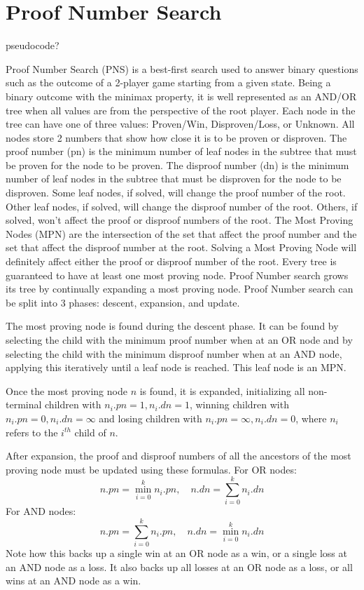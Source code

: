 \section{Proof Number Search} \label{sec:PNS}

pseudocode?

Proof Number Search (PNS) is a best-first search used to answer binary questions such as the outcome of a 2-player game starting from a given state. Being a binary outcome with the minimax property, it is well represented as an AND/OR tree when all values are from the perspective of the root player. Each node in the tree can have one of three values: Proven/Win, Disproven/Loss, or Unknown. All nodes store 2 numbers that show how close it is to be proven or disproven. The proof number (pn) is the minimum number of leaf nodes in the subtree that must be proven for the node to be proven. The disproof number (dn) is the minimum number of leaf nodes in the subtree that must be disproven for the node to be disproven. Some leaf nodes, if solved, will change the proof number of the root. Other leaf nodes, if solved, will change the disproof number of the root. Others, if solved, won't affect the proof or disproof numbers of the root. The Most Proving Nodes (MPN) are the intersection of the set that affect the proof number and the set that affect the disproof number at the root. Solving a Most Proving Node will definitely affect either the proof or disproof number of the root. Every tree is guaranteed to have at least one most proving node. Proof Number search grows its tree by continually expanding a most proving node. Proof Number search can be split into 3 phases: descent, expansion, and update.

The most proving node is found during the descent phase. It can be found by selecting the child with the minimum proof number when at an OR node and by selecting the child with the minimum disproof number when at an AND node, applying this iteratively until a leaf node is reached. This leaf node is an MPN.

Once the most proving node $n$ is found, it is expanded, initializing all non-terminal children with $n_i.pn = 1, n_i.dn = 1$, winning children with $n_i.pn = 0, n_i.dn = \infty$ and losing children with $n_i.pn = \infty, n_i.dn = 0 $, where $n_i$ refers to the $i^{th}$ child of $n$.

After expansion, the proof and disproof numbers of all the ancestors of the most proving node must be updated using these formulas. For OR nodes: $$ n.pn = \displaystyle\min\limits_{i=0}^k n_i.pn,\quad n.dn = \displaystyle\sum\limits_{i=0}^k n_i.dn $$ For AND nodes: $$ n.pn = \displaystyle\sum\limits_{i=0}^k n_i.pn, \quad n.dn = \displaystyle\min\limits_{i=0}^k n_i.dn $$ Note how this backs up a single win at an OR node as a win, or a single loss at an AND node as a loss. It also backs up all losses at an OR node as a loss, or all wins at an AND node as a win. %

